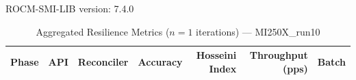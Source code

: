 ROCM-SMI-LIB version: 7.4.0

\begin{table}[htbp]
\caption{Aggregated Resilience Metrics ($n=1$ iterations) --- MI250X_run10}
\begin{tabular}{l l l r r r r}
\hline
Phase & API & Reconciler & Accuracy & Hosseini Index & Throughput (pps) & Batch \\
\hline
\hline
\end{tabular}
\end{table}
